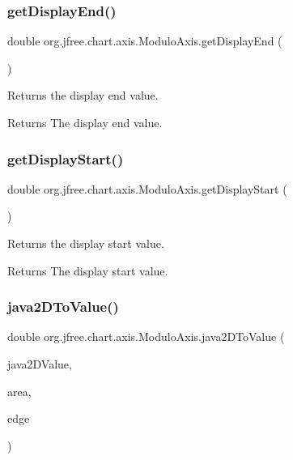 \subsubsection{\texorpdfstring{get\+Display\+End()}{getDisplayEnd()}}
{\footnotesize\ttfamily double org.\+jfree.\+chart.\+axis.\+Modulo\+Axis.\+get\+Display\+End (\begin{DoxyParamCaption}{ }\end{DoxyParamCaption})}

Returns the display end value.

\begin{DoxyReturn}{Returns}
The display end value. 
\end{DoxyReturn}
\mbox{\label{classorg_1_1jfree_1_1chart_1_1axis_1_1_modulo_axis_ad000be9bdbfbd452202c1594b2b70364}} 
\subsubsection{\texorpdfstring{get\+Display\+Start()}{getDisplayStart()}}
{\footnotesize\ttfamily double org.\+jfree.\+chart.\+axis.\+Modulo\+Axis.\+get\+Display\+Start (\begin{DoxyParamCaption}{ }\end{DoxyParamCaption})}

Returns the display start value.

\begin{DoxyReturn}{Returns}
The display start value. 
\end{DoxyReturn}
\mbox{\label{classorg_1_1jfree_1_1chart_1_1axis_1_1_modulo_axis_a0881c74867dd37ac58f399bc7c0c1c8e}} 
\subsubsection{\texorpdfstring{java2\+D\+To\+Value()}{java2DToValue()}}
{\footnotesize\ttfamily double org.\+jfree.\+chart.\+axis.\+Modulo\+Axis.\+java2\+D\+To\+Value (\begin{DoxyParamCaption}\item[{double}]{java2\+D\+Value,  }\item[{Rectangle2D}]{area,  }\item[{Rectangle\+Edge}]{edge }\end{DoxyParamCaption})}

